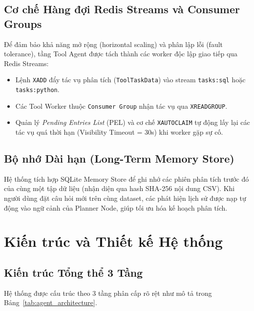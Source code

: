 \documentclass[12pt, a4paper]{article}
\begin{document}
\subsection{Cơ chế Hàng đợi Redis Streams và Consumer Groups}
Để đảm bảo khả năng mở rộng (horizontal scaling) và phân lập lỗi (fault tolerance), tầng Tool Agent được tách thành các worker độc lập giao tiếp qua Redis Streams:
\begin{itemize}
    \item Lệnh \texttt{XADD} đẩy tác vụ phân tích (\texttt{ToolTaskData}) vào stream \texttt{tasks:sql} hoặc \texttt{tasks:python}.
    \item Các Tool Worker thuộc \texttt{Consumer Group} nhận tác vụ qua \texttt{XREADGROUP}.
    \item Quản lý \textit{Pending Entries List} (PEL) và cơ chế \texttt{XAUTOCLAIM} tự động lấy lại các tác vụ quá thời hạn (Visibility Timeout = 30s) khi worker gặp sự cố.
\end{itemize}

\subsection{Bộ nhớ Dài hạn (Long-Term Memory Store)}
Hệ thống tích hợp SQLite Memory Store để ghi nhớ các phiên phân tích trước đó của cùng một tập dữ liệu (nhận diện qua hash SHA-256 nội dung CSV). Khi người dùng đặt câu hỏi mới trên cùng dataset, các phát hiện lịch sử được nạp tự động vào ngữ cảnh của Planner Node, giúp tối ưu hóa kế hoạch phân tích.

\section{Kiến trúc và Thiết kế Hệ thống}

\subsection{Kiến trúc Tổng thể 3 Tầng}
Hệ thống được cấu trúc theo 3 tầng phân cấp rõ rệt như mô tả trong Bảng~\ref{tab:agent_architecture}.
\end{document}
